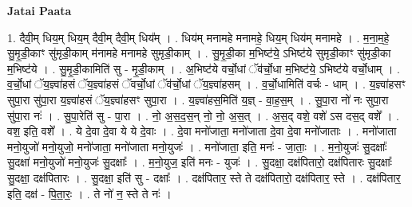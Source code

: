 \documentclass[17pt]{extarticle}
\begin{document}
\textbf{Jatai Paata} \newline

1. दैवी॒म् धिय॒म् धिय॒म् दैवी॒म् दैवी॒म् धिय᳚म् । . धिय॑म् मनामहे मनामहे॒ धिय॒म् धिय॑म् मनामहे । . म॒ना॒म॒हे॒ सु॒मृ॒डी॒काꣳ सु॑मृडी॒काम् म॑नामहे मनामहे सुमृडी॒काम् । . सु॒मृ॒डी॒का म॒भिष्ट॑ये॒ ऽभिष्ट॑ये सुमृडी॒काꣳ सु॑मृडी॒का म॒भिष्ट॑ये । . सु॒मृ॒डी॒कामिति॑ सु - मृ॒डी॒काम् । . अ॒भिष्ट॑ये वर्चो॒धां ॅव॑र्चो॒धा म॒भिष्ट॑ये॒ ऽभिष्ट॑ये वर्चो॒धाम् । . व॒र्चो॒धां ॅय॒ज्ञ्वा॑हसं ॅय॒ज्ञ्वा॑हसं ॅवर्चो॒धां ॅव॑र्चो॒धां ॅय॒ज्ञ्वा॑हसम् । . व॒र्चो॒धामिति॑ वर्चः - धाम् । . य॒ज्ञ्वा॑हसꣳ सुपा॒रा सु॑पा॒रा य॒ज्ञ्वा॑हसं ॅय॒ज्ञ्वा॑हसꣳ सुपा॒रा । . य॒ज्ञ्वा॑हस॒मिति॑ य॒ज्ञ् - वा॒ह॒स॒म् । . सु॒पा॒रा नो॑ नः सुपा॒रा सु॑पा॒रा नः॑ । . सु॒पा॒रेति॑ सु - पा॒रा । . नो॒ अ॒स॒द॒स॒न् नो॒ नो॒ अ॒स॒त् । . अ॒स॒द् वशे॒ वशे॑ ऽस दस॒द् वशे᳚ । . वश॒ इति॒ वशे᳚ । . ये दे॒वा दे॒वा ये ये दे॒वाः । . दे॒वा मनो॑जाता॒ मनो॑जाता दे॒वा दे॒वा मनो॑जाताः । . मनो॑जाता मनो॒युजो॑ मनो॒युजो॒ मनो॑जाता॒ मनो॑जाता मनो॒युजः॑ । . मनो॑जाता॒ इति॒ मनः॑ - जा॒ताः॒ । . म॒नो॒युजः॑ सु॒दक्षाः᳚ सु॒दक्षा॑ मनो॒युजो॑ मनो॒युजः॑ सु॒दक्षाः᳚ । . म॒नो॒युज॒ इति॑ मनः - युजः॑ । . सु॒दक्षा॒ दक्ष॑पितारो॒ दक्ष॑पितारः सु॒दक्षाः᳚ सु॒दक्षा॒ दक्ष॑पितारः । . सु॒दक्षा॒ इति॑ सु - दक्षाः᳚ । . दक्ष॑पितार॒ स्ते ते दक्ष॑पितारो॒ दक्ष॑पितार॒ स्ते । . दक्ष॑पितार॒ इति॒ दक्ष॑ - पि॒ता॒रः॒ । . ते नो॑ न॒ स्ते ते नः॑ । \newline
\end{document}
